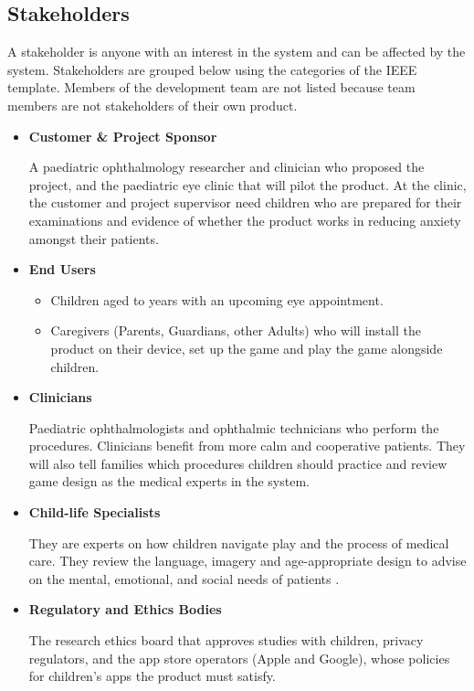 \documentclass[12pt]{article}
\newcommand{\constref}[1]{%
    \hyperref[const:#1]{\texttt{\detokenize{#1}}}%
}
\begin{document}
\subsection{Stakeholders}
A stakeholder is anyone with an interest in the system and can be affected by the system. 
Stakeholders are grouped below using the categories of the IEEE template. Members of the 
development team are not listed because team members are not stakeholders of their own product.
\begin{itemize}
\item \textbf{Customer \& Project Sponsor}

A paediatric ophthalmology researcher and clinician who proposed 
the project, and the paediatric eye clinic that will pilot the product. At the clinic, the customer
and project supervisor need children who are prepared for their examinations and evidence of whether 
the product works in reducing anxiety amongst their patients.

\item \textbf{End Users}
\begin{itemize}
    \item Children aged \constref{MIN_AGE} to \constref{MAX_AGE} years with an upcoming eye appointment.
    \item Caregivers (Parents, Guardians, other Adults) who will install the product on their device, set 
    up the game and play the game alongside children.
\end{itemize}

\item \textbf{Clinicians}

Paediatric ophthalmologists and ophthalmic technicians who perform the procedures. Clinicians 
benefit from more calm and cooperative patients. They will also tell families which procedures children should 
practice and review game design as the medical experts in the system.

\item \textbf{Child-life Specialists}

They are experts on how children navigate play and the process of medical care. 
They review the language, imagery and age-appropriate design to advise on the mental, emotional, and social 
needs of patients \cite{mayoChildLifeSpecialist}.

\item \textbf{Regulatory and Ethics Bodies}

The research ethics board that approves studies with children, privacy regulators, and the app store operators 
(Apple and Google), whose policies for children's apps the product must satisfy.


\end{itemize}
\end{document}
